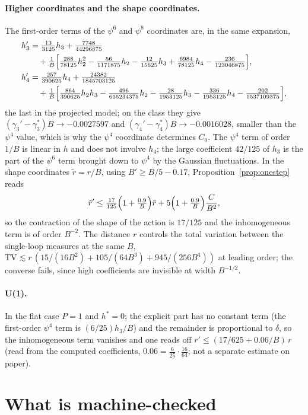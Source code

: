 \documentclass[11pt,a4paper]{article}
\theoremstyle{definition}
\theoremstyle{remark}
\begin{document}
\paragraph{Higher coordinates and the shape coordinates.}
The first-order terms of the $\psi^6$ and $\psi^8$ coordinates are, in the same expansion,
\begin{align*}
h_3'&=\tfrac{13}{3125}h_3+\tfrac{7748}{44296875}\\
&\quad+\tfrac1B\Bigl[\tfrac{288}{78125}h_2^2-\tfrac{56}{1171875}h_2-\tfrac{12}{15625}h_3+\tfrac{6984}{78125}h_4-\tfrac{236}{123046875}\Bigr],\\
h_4'&=\tfrac{257}{390625}h_4+\tfrac{24382}{1845703125}\\
&\quad+\tfrac1B\Bigl[\tfrac{864}{390625}h_2h_3-\tfrac{496}{615234375}h_2-\tfrac{28}{1953125}h_3-\tfrac{336}{1953125}h_4-\tfrac{202}{5537109375}\Bigr],
\end{align*}
the last in the projected model; on the class they give $(\gamma_3'-\gamma_3^*)B\to-0.0027597$ and $(\gamma_4'-\gamma_4^*)B\to-0.0016028$, smaller than the $\psi^4$ value, which is why the $\psi^4$ coordinate determines $C_0$.
The $\psi^4$ term of order $1/B$ is linear in $h$ and does not involve $h_4$; the large coefficient $42/125$ of $h_3$ is the part of the $\psi^6$ term brought down to $\psi^4$ by the Gaussian fluctuations.
In the shape coordinates $\tilde r=r/B$, using $B'\ge B/5-0.17$, Proposition~\ref{prop:onestep} reads
\[
\tilde r'\le\tfrac{17}{125}\Bigl(1+\tfrac{0.9}{B}\Bigr)\tilde r+5\Bigl(1+\tfrac{0.9}{B}\Bigr)\frac{C}{B^2},
\]
so the contraction of the shape of the action is $17/125$ and the inhomogeneous term is of order $B^{-2}$.
The distance $r$ controls the total variation between the single-loop measures at the same $B$, $\mathrm{TV}\lesssim r\,(15/(16B^2)+105/(64B^3)+945/(256B^4))$ at leading order; the converse fails, since high coefficients are invisible at width $B^{-1/2}$.

\paragraph{U(1).}
In the flat case $P=1$ and $h^*=0$; the explicit part has no constant term (the first-order $\psi^4$ term is $(6/25)h_3/B$) and the remainder is proportional to $\delta$, so the inhomogeneous term vanishes and one reads off $r'\le(17/625+0.06/B)\,r$ (read from the computed coefficients, $0.06=\tfrac6{25}\cdot\tfrac{16}{64}$; not a separate estimate on paper).

\section{What is machine-checked}\label{sec:lean}
\sloppy
\end{document}
